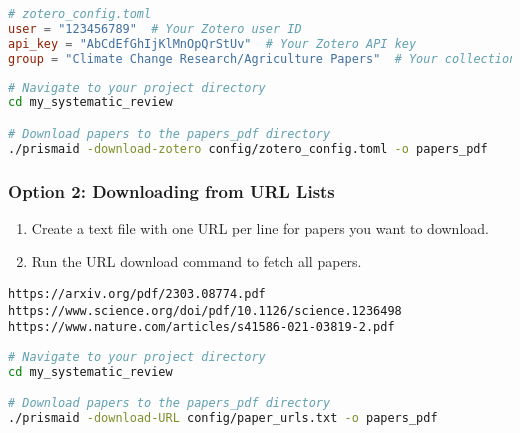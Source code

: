 \begin{configbox}
\begin{lstlisting}[language=TOML]
# zotero_config.toml
user = "123456789"  # Your Zotero user ID
api_key = "AbCdEfGhIjKlMnOpQrStUv"  # Your Zotero API key
group = "Climate Change Research/Agriculture Papers"  # Your collection path
\end{lstlisting}
\end{configbox}

\begin{commandbox}
\begin{lstlisting}[language=Bash]
# Navigate to your project directory
cd my_systematic_review

# Download papers to the papers_pdf directory
./prismaid -download-zotero config/zotero_config.toml -o papers_pdf
\end{lstlisting}
\end{commandbox}


\subsubsection{Option 2: Downloading from URL Lists}

\begin{enumerate}
    \item Create a text file with one URL per line for papers you want to download.
    \item Run the URL download command to fetch all papers.
\end{enumerate}

\begin{commandbox}
\begin{lstlisting}
https://arxiv.org/pdf/2303.08774.pdf
https://www.science.org/doi/pdf/10.1126/science.1236498
https://www.nature.com/articles/s41586-021-03819-2.pdf
\end{lstlisting}
\end{commandbox}

\begin{commandbox}
\begin{lstlisting}[language=Bash]
# Navigate to your project directory
cd my_systematic_review

# Download papers to the papers_pdf directory
./prismaid -download-URL config/paper_urls.txt -o papers_pdf
\end{lstlisting}
\end{commandbox}

